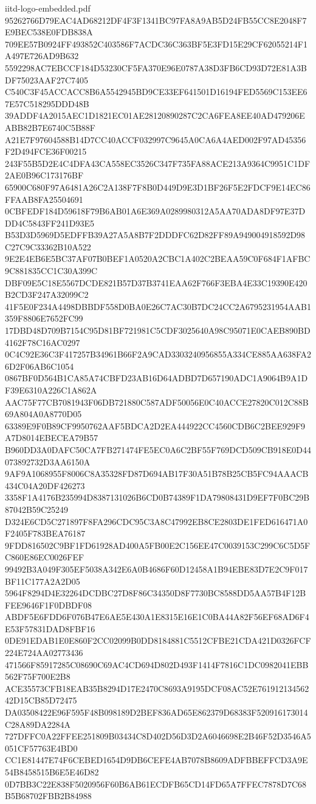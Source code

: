 \begin{filecontents*}[overwrite]{iitd-logo-embedded.pdf}
95262766D79EAC4AD68212DF4F3F1341BC97FA8A9AB5D24FB55CC8E2048F7E9BEC538E0FDB838A
709EE57B0924FF493852C403586F7ACDC36C363BF5E3FD15E29CF62055214F1A497E726AD9B632
5592298AC7EBCCF184D53230CF5FA370E96E0787A38D3FB6CD93D72E81A3BDF75023AAF27C7405
C540C3F45ACCACC8B6A5542945BD9CE33EF641501D16194FED5569C153EE67E57C518295DDD48B
39ADDF4A2015AEC1D1821EC01AE28120890287C2CA6FEA8EE40AD479206EABB82B7E6740C5B88F
A21E7F97604588B14D7CC40ACCF032997C9645A0CA6A4AED002F97AD45356F2D494FCE36F00215
243F55B5D2E4C4DFA43CA558EC3526C347F735FA88ACE213A9364C9951C1DF2AE0B96C173176BF
65900C680F97A6481A26C2A138F7F8B0D449D9E3D1BF26F5E2FDCF9E14EC86FFAAB8FA25504691
0CBFEDF184D59618F79B6AB01A6E369A0289980312A5AA70ADA8DF97E37DDD4C5843FF241D93E5
B53D3D5969D5EDFFB39A27A5A8B7F2DDDFC62D82FF89A949004918592D98C27C9C33362B10A522
9E2E4EB6E5BC37AF07B0BEF1A0520A2CBC1A402C2BEAA59C0F684F1AFBC9C881835CC1C30A399C
DBF09E5C18E5567DCDE821B57D37B3741EAA62F766F3EBA4E33C19390E420B2CD3F247A32099C2
41F5E0F234A4498DBBDF558D0BA0E26C7AC30B7DC24CC2A6795231954AAB1359F8806E7652FC99
17DBD48D709B7154C95D81BF721981C5CDF3025640A98C95071E0CAEB890BD4162F78C16AC0297
0C4C92E36C3F417257B34961B66F2A9CAD3303240956855A334CE885AA638FA26D2F06AB6C1054
0867BF0D564B1CA85A74CBFD23AB16D64ADBD7D657190ADC1A9064B9A1DF39E6310A226C1A862A
AAC75F77CB7081943F06DB721880C587ADF50056E0C40ACCE27820C012C88B69A804A0A8770D05
63389E9F0B89CF9950762AAF5BDCA2D2EA444922CC4560CDB6C2BEE929F9A7D8014EBECEA79B57
B960DD3A0DAFC50CA7FB271474FE5EC0A6C2BF55F769DCD509CB918E0D44073892732D3AA6150A
9AF9A1068955F8006C8A35328FD87D694AB17F30A51B78B25CB5FC94AAACB434C04A20DF426273
3358F1A4176B235994D8387131026B6CD0B74389F1DA79808431D9EF7F0BC29B87042B59C25249
D324E6CD5C271897F8FA296CDC95C3A8C47992EB8CE2803DE1FED616471A0F2405F783BEA76187
9FDD816502C9BF1FD61928AD400A5FB00E2C156EE47C0039153C299C6C5D5FC860E86EC0026FEF
99492B3A049F305EF5038A342E6A0B4686F60D12458A1B94EBE83D7E2C9F017BF11C177A2A2D05
5964F8294D4E32264DCDBC27D8F86C34350D8F7730BC8588DD5AA57B4F12BFEE9646F1F0DBDF08
ABDF5E6FDD6F076B47E6AE5E430A1E8315E16E1C0BA44A82F56EF68AD6F4E53F57831DAD8FBF16
0DE91EDAB1E0E860F2CC02099B0DD8184881C5512CFBE21CDA421D0326FCF224E724AA02773436
471566F85917285C08690C69AC4CD694D802D493F1414F7816C1DC0982041EBB562F75F700E2B8
ACE35573CFB18EAB35B8294D17E2470C8693A9195DCF08AC52E76191213456242D15CB85D72475
DA03508422E96F595F48B098189D2BEF836AD65E862379D68383F520916173014C28A89DA2284A
727DFFC0A22FFEE251809B03434C8D402D56D3D2A6046698E2B46F52D3546A5051CF57763E4BD0
CC1E81447E74F6CEBED1654D9DB6CEFE4AB7078B8609ADFBBEFFCD3A9E54B8458515B6E5E46D82
0D7BB3C22E838F5020956F60B6AB61ECDFB65CD14FD65A7FFEC7878D7C68B5B68702FBB2B84988

\end{filecontents*}

